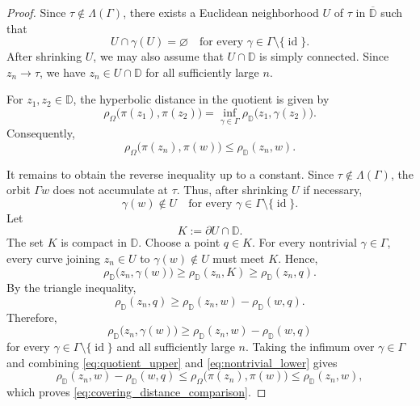 \documentclass[10pt,a4paper]{amsart}
\numberwithin{equation}{section}
\begin{document}
\begin{proof}
Since $\tau\notin\Lambda(\Gamma)$, there exists a Euclidean neighborhood
$U$ of $\tau$ in $\overline{\mathbb D}$ such that
\begin{equation*}
\label{eq:U_disjoint_translates}
U\cap\gamma(U)=\varnothing
\quad
\text{for every }\gamma\in\Gamma\setminus\{\operatorname{id}\}.
\end{equation*}
After shrinking $U$, we may also assume that $U\cap\mathbb D$ is
simply connected. Since $z_n\to\tau$, we have
$z_n\in U\cap\mathbb D$ for all sufficiently large $n$.

For $z_1,z_2\in\mathbb D$, the hyperbolic distance in the quotient is
given by
\begin{equation*}
\label{eq:quotient_distance}
\rho_\Omega\bigl(\pi(z_1),\pi(z_2)\bigr)
=
\inf_{\gamma\in\Gamma}
\rho_{\mathbb D}\bigl(z_1,\gamma(z_2)\bigr).
\end{equation*}
Consequently,
\begin{equation}
\label{eq:quotient_upper}
\rho_\Omega\bigl(\pi(z_n),\pi(w)\bigr)
\le
\rho_{\mathbb D}(z_n,w).
\end{equation}

It remains to obtain the reverse inequality up to a constant. Since
$\tau\notin\Lambda(\Gamma)$, the orbit $\Gamma w$ does not accumulate at
$\tau$. Thus, after shrinking $U$ if necessary,
\begin{equation*}
\label{eq:orbit_avoids_U}
\gamma(w)\notin U
\quad
\text{for every }\gamma\in\Gamma\setminus\{\operatorname{id}\}.
\end{equation*}
Let
\begin{equation*}
K:=\partial U\cap\mathbb D.
\end{equation*}
The set $K$ is compact in $\mathbb D$. Choose a point $q\in K$. For every
nontrivial $\gamma\in\Gamma$, every curve joining $z_n\in U$ to
$\gamma(w)\notin U$ must meet $K$. Hence,
\begin{equation*}
\rho_{\mathbb D}\bigl(z_n,\gamma(w)\bigr)
\ge
\rho_{\mathbb D}(z_n,K)
\ge
\rho_{\mathbb D}(z_n,q).
\end{equation*}
By the triangle inequality,
\begin{equation*}
\rho_{\mathbb D}(z_n,q)
\ge
\rho_{\mathbb D}(z_n,w)-\rho_{\mathbb D}(w,q).
\end{equation*}
Therefore,
\begin{equation}
\label{eq:nontrivial_lower}
\rho_{\mathbb D}\bigl(z_n,\gamma(w)\bigr)
\ge
\rho_{\mathbb D}(z_n,w)-\rho_{\mathbb D}(w,q)
\end{equation}
for every $\gamma\in\Gamma\setminus\{\operatorname{id}\}$ and all
sufficiently large $n$. Taking the infimum over $\gamma\in\Gamma$ and
combining \eqref{eq:quotient_upper} and \eqref{eq:nontrivial_lower} gives
\begin{equation*}
\rho_{\mathbb D}(z_n,w)-\rho_{\mathbb D}(w,q)
\le
\rho_\Omega\bigl(\pi(z_n),\pi(w)\bigr)
\le
\rho_{\mathbb D}(z_n,w),
\end{equation*}
which proves \eqref{eq:covering_distance_comparison}.
\end{proof}
\end{document}
